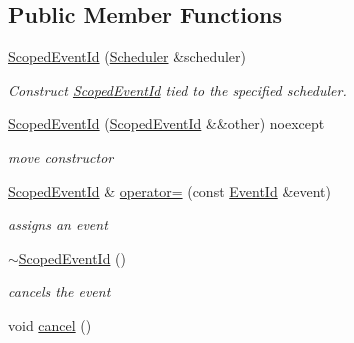 \subsection*{Public Member Functions}
\begin{DoxyCompactItemize}
\item 
\hyperlink{classndn_1_1util_1_1scheduler_1_1ScopedEventId_ada0da48104c5508bc01a71a007ae86d3}{Scoped\+Event\+Id} (\hyperlink{classndn_1_1util_1_1scheduler_1_1Scheduler}{Scheduler} \&scheduler)
\begin{DoxyCompactList}\small\item\em Construct \hyperlink{classndn_1_1util_1_1scheduler_1_1ScopedEventId}{Scoped\+Event\+Id} tied to the specified scheduler. \end{DoxyCompactList}\item 
\hyperlink{classndn_1_1util_1_1scheduler_1_1ScopedEventId_a0f1e383625653aedc1681b5a0593f97d}{Scoped\+Event\+Id} (\hyperlink{classndn_1_1util_1_1scheduler_1_1ScopedEventId}{Scoped\+Event\+Id} \&\&other) noexcept\hypertarget{classndn_1_1util_1_1scheduler_1_1ScopedEventId_a0f1e383625653aedc1681b5a0593f97d}{}\label{classndn_1_1util_1_1scheduler_1_1ScopedEventId_a0f1e383625653aedc1681b5a0593f97d}

\begin{DoxyCompactList}\small\item\em move constructor \end{DoxyCompactList}\item 
\hyperlink{classndn_1_1util_1_1scheduler_1_1ScopedEventId}{Scoped\+Event\+Id} \& \hyperlink{classndn_1_1util_1_1scheduler_1_1ScopedEventId_ab64287d940cc197a4293082640b16ff6}{operator=} (const \hyperlink{classEventId}{Event\+Id} \&event)
\begin{DoxyCompactList}\small\item\em assigns an event \end{DoxyCompactList}\item 
\hyperlink{classndn_1_1util_1_1scheduler_1_1ScopedEventId_a3fa7ba9ecb6724086a5758c127352d3b}{$\sim$\+Scoped\+Event\+Id} ()\hypertarget{classndn_1_1util_1_1scheduler_1_1ScopedEventId_a3fa7ba9ecb6724086a5758c127352d3b}{}\label{classndn_1_1util_1_1scheduler_1_1ScopedEventId_a3fa7ba9ecb6724086a5758c127352d3b}

\begin{DoxyCompactList}\small\item\em cancels the event \end{DoxyCompactList}\item 
void \hyperlink{classndn_1_1util_1_1scheduler_1_1ScopedEventId_a4e0c49aa78843fcd8551989652edfe95}{cancel} ()\hypertarget{classndn_1_1util_1_1scheduler_1_1ScopedEventId_a4e0c49aa78843fcd8551989652edfe95}{}\label{classndn_1_1util_1_1scheduler_1_1ScopedEventId_a4e0c49aa78843fcd8551989652edfe95}


\end{DoxyCompactItemize}
